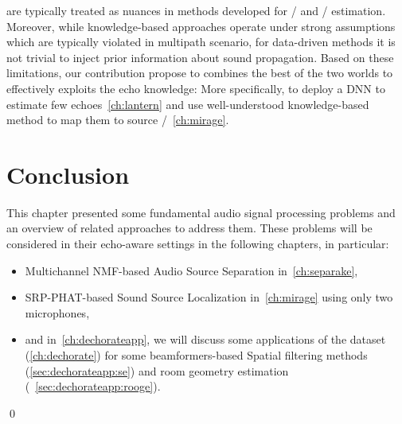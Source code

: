  are typically treated as nuances in methods developed for \SSL/ and \DOAs/ estimation.
Moreover, while knowledge-based approaches operate under strong assumptions which are typically violated in multipath scenario,
for data-driven methods it is not trivial to inject prior information about sound propagation.
Based on these limitations, our contribution propose to combines the best of the two worlds to effectively exploits the echo knowledge:
More specifically, to deploy a \ac{DNN} to estimate few echoes~\cref{ch:lantern} and use well-understood knowledge-based method to map them to source \DOAs/~\cref{ch:mirage}.

\section{Conclusion}\label{sec:application:conclusion}
This chapter presented some fundamental audio signal processing problems and an overview of related approaches to address them.
These problems will be considered in their echo-aware settings in the following chapters, in particular:
\begin{itemize}
    \item Multichannel NMF-based Audio Source Separation in~\cref{ch:separake},
    \item SRP-PHAT-based Sound Source Localization in~\cref{ch:mirage} using only two microphones,
    \item and in~\cref{ch:dechorateapp}, we will discuss some applications of the  dataset (\cref{ch:dechorate}) for some beamformers-based Spatial filtering methods (\cref{sec:dechorateapp:se})
            and room geometry estimation (~\cref{sec:dechorateapp:rooge}).
\end{itemize}
\qed

